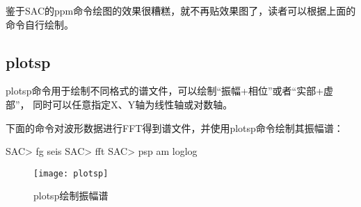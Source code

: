 鉴于SAC的ppm命令绘图的效果很糟糕，就不再贴效果图了，读者可以根据上面的命令自行绘制。

\subsection{plotsp}
plotsp命令用于绘制不同格式的谱文件，可以绘制``振幅+相位''或者``实部+虚部''，
同时可以任意指定X、Y轴为线性轴或对数轴。

下面的命令对波形数据进行FFT得到谱文件，并使用plotsp命令绘制其振幅谱：
\begin{SACCode}
SAC> fg seis
SAC> fft
SAC> psp am loglog
\end{SACCode}

\begin{figure}[H]
\centering
\texttt{[image: plotsp]}
\caption{plotsp绘制振幅谱}
\label{fig:plotsp}
\end{figure}
